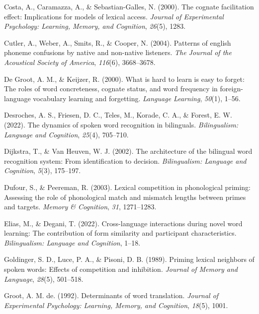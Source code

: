 \documentclass[
]{article}
\newlength{\cslhangindent}
\newenvironment{CSLReferences}[2] %
 {\begin{list}{}{%
  \setlength{\itemindent}{0pt}
  \setlength{\leftmargin}{0pt}
  \setlength{\parsep}{0pt}
  \ifodd #1
   \setlength{\leftmargin}{\cslhangindent}
   \setlength{\itemindent}{-1\cslhangindent}
  \fi
  \setlength{\itemsep}{#2\baselineskip}}}
 {\end{list}}
\begin{document}
\begin{CSLReferences}{1}{0}
Costa, A., Caramazza, A., \& Sebastian-Galles, N. (2000). The cognate
facilitation effect: Implications for models of lexical access.
\emph{Journal of Experimental Psychology: Learning, Memory, and
Cognition}, \emph{26}(5), 1283.

Cutler, A., Weber, A., Smits, R., \& Cooper, N. (2004). Patterns of
english phoneme confusions by native and non-native listeners. \emph{The
Journal of the Acoustical Society of America}, \emph{116}(6),
3668--3678.

De Groot, A. M., \& Keijzer, R. (2000). What is hard to learn is easy to
forget: The roles of word concreteness, cognate status, and word
frequency in foreign-language vocabulary learning and forgetting.
\emph{Language Learning}, \emph{50}(1), 1--56.

Desroches, A. S., Friesen, D. C., Teles, M., Korade, C. A., \& Forest,
E. W. (2022). The dynamics of spoken word recognition in bilinguals.
\emph{Bilingualism: Language and Cognition}, \emph{25}(4), 705--710.

Dijkstra, T., \& Van Heuven, W. J. (2002). The architecture of the
bilingual word recognition system: From identification to decision.
\emph{Bilingualism: Language and Cognition}, \emph{5}(3), 175--197.

Dufour, S., \& Peereman, R. (2003). Lexical competition in phonological
priming: Assessing the role of phonological match and mismatch lengths
between primes and targets. \emph{Memory \& Cognition}, \emph{31},
1271--1283.

Elias, M., \& Degani, T. (2022). Cross-language interactions during
novel word learning: The contribution of form similarity and participant
characteristics. \emph{Bilingualism: Language and Cognition}, 1--18.

Goldinger, S. D., Luce, P. A., \& Pisoni, D. B. (1989). Priming lexical
neighbors of spoken words: Effects of competition and inhibition.
\emph{Journal of Memory and Language}, \emph{28}(5), 501--518.

Groot, A. M. de. (1992). Determinants of word translation. \emph{Journal
of Experimental Psychology: Learning, Memory, and Cognition},
\emph{18}(5), 1001.


\end{CSLReferences}
\end{document}
